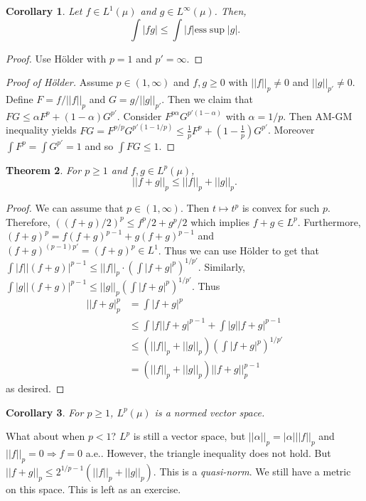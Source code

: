 \documentclass{article}
\newtheorem{theorem}{Theorem}[section]
\newtheorem{corollary}[theorem]{Corollary}
\theoremstyle{definition}
\begin{document}
\begin{corollary}
    Let $f\in L^1(\mu)$ and $g\in L^\infty(\mu)$. Then,
    \[
        \int |fg| \leq \int |f|\text{ess}\sup |g|.
    \]
\end{corollary}
\begin{proof}
    Use H\"older with $p=1$ and $p'=\infty$.
\end{proof}

\begin{proof}[Proof of H\"older]
    Assume $p\in(1,\infty)$ and $f,g\geq 0$ with $||f||_p\neq 0$ and $||g||_{p'}\neq 0$. Define $F=f/||f||_p$ and $G=g/||g||_{p'}$.
    Then we claim that $FG\leq \alpha F^p+(1-\alpha) G^{p'}$. Consider $F^{p\alpha}G^{p'(1-\alpha)}$ with $\alpha=1/p$. Then
    AM-GM inequality yields $FG=F^{p/p}G^{p'(1-1/p)}\leq \frac{1}{p}F^p+(1-\frac{1}{p}) G^{p'}$.
    Moreover $\int F^p=\int G^{p'}=1$ and so $\int FG\leq 1$.
\end{proof}

\begin{theorem}
    For $p\geq 1$ and $f,g\in L^p(\mu)$,
    \[
        ||f+g||_p\leq ||f||_p+||g||_p.
    \]
\end{theorem}

\begin{proof}
    We can assume that $p\in(1,\infty)$. Then $t\mapsto t^p$ is convex for such $p$. Therefore, $((f+g)/2)^p\leq f^p/2+g^p/2$
    which implies $f+g\in L^p$. Furthermore, $(f+g)^p=f(f+g)^{p-1}+g(f+g)^{p-1}$ and $(f+g)^{(p-1)p'}=(f+g)^p\in L^1$. Thus we can
    use H\"older to get that $\int |f||(f+g)|^{p-1}\leq ||f||_p \cdot \left(\int|f+g|^p\right)^{1/p'}$. Similarly,
    $\int|g||(f+g)|^{p-1}\leq ||g||_p\left(\int |f+g|^p\right)^{1/p'}$. Thus 
    \begin{align*}
        ||f+g|_p^p&=\int |f+g|^p\\
        &\leq \int |f||f+g|^{p-1} + \int |g||f+g|^{p-1}\\
        &\leq (||f||_p+||g||_p)\left(\int |f+g|^p\right)^{1/p'}\\
        &=(||f||_p+||g||_p)||f+g||_p^{p-1}
    \end{align*}
    as desired.
\end{proof}

\begin{corollary}
    For $p\geq 1$, $L^p(\mu)$ is a normed vector space.
\end{corollary}

What about when $p<1$? $L^p$ is still a vector space, but $||\alpha||_p=|\alpha|||f||_p$ and $||f||_p=0\Rightarrow f=0$ a.e..
However, the triangle inequality does not hold. But $||f+g||_p\leq 2^{1/p-1} (||f||_p+||g||_p)$. This is a \textit{quasi-norm}.
We still have a metric on this space. This is left as an exercise.
\end{document}
